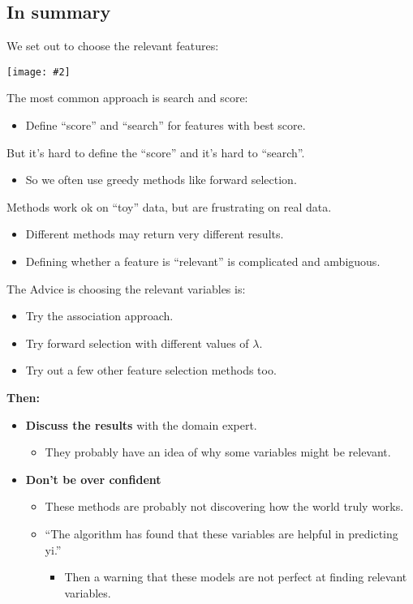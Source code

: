 \documentclass{article}
\def\blu#1{{\color{blu}#1}}
\def\gre#1{{\color{gre}#1}}
\def\red#1{{\color{red}#1}}
\newcommand{\centerfig}[2]{\begin{center}\texttt{[image: \#2]}\end{center}}
\begin{document}
\subsection*{In summary}
We set out to choose the relevant features:
\centerfig{0.4}{summ-1}
The most common approach is \blu{search and score}:
\begin{itemize}
	\item Define “score” and “search” for features with best score.
\end{itemize}
But it’s \red{hard to define the “score” and it’s hard to “search”}. 
\begin{itemize}
	\item So we often use greedy methods like \blu{forward selection}.
\end{itemize}
Methods work ok on “toy” data, but are \red{frustrating on real data}. 
\begin{itemize}
	\item Different methods may return very different results.
	\item Defining whether a feature is “relevant” is complicated and ambiguous.
\end{itemize}
The Advice is choosing the relevant variables is:
\begin{itemize}
	\item Try the association approach.
	\item Try forward selection with different values of $\lambda$.
	\item Try out a few other feature selection methods too.
\end{itemize}
\textbf{Then:}
\begin{itemize}
	\item \gre{\textbf{Discuss the results}} with the domain expert.
	\begin{itemize}
		\item They probably have an idea of why some variables might be relevant.
	\end{itemize}
\item \red{\textbf{Don’t be over confident}}
\begin{itemize}
	\item These methods are probably not discovering how the world truly works.
	\item “The algorithm has found that these variables are helpful in predicting yi.” 
	\begin{itemize}
		\item Then a warning that these models are not perfect at finding relevant variables.
	\end{itemize}
\end{itemize}
\end{itemize}
\newpage
\end{document}
